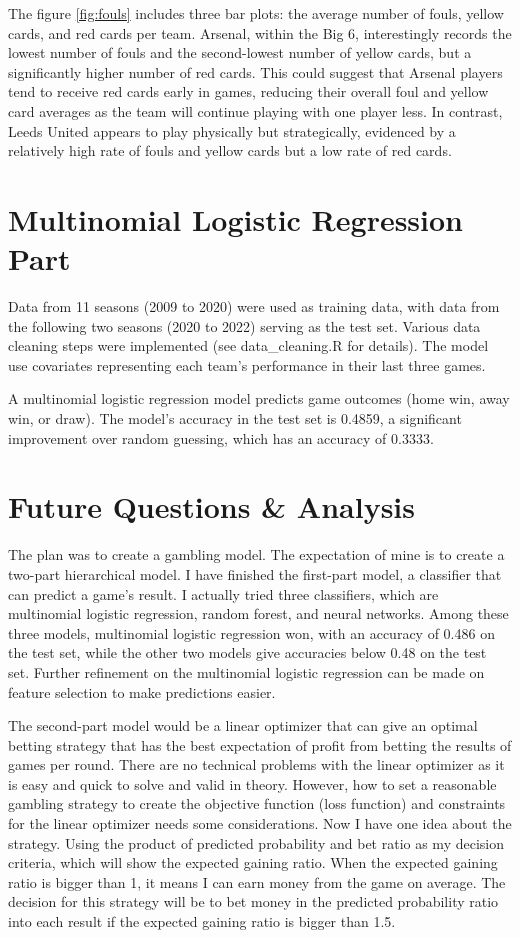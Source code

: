 \documentclass{article}
\begin{document}
The figure \ref{fig:fouls} includes three bar plots: the average number of fouls, yellow cards, and red cards per team. Arsenal, within the Big 6, interestingly records the lowest number of fouls and the second-lowest number of yellow cards, but a significantly higher number of red cards. This could suggest that Arsenal players tend to receive red cards early in games, reducing their overall foul and yellow card averages as the team will continue playing with one player less. In contrast, Leeds United appears to play physically but strategically, evidenced by a relatively high rate of fouls and yellow cards but a low rate of red cards.

\section{Multinomial Logistic Regression Part}
Data from 11 seasons (2009 to 2020) were used as training data, with data from the following two seasons (2020 to 2022) serving as the test set. Various data cleaning steps were implemented (see data\_cleaning.R for details). The model use covariates representing each team's performance in their last three games.

A multinomial logistic regression model predicts game outcomes (home win, away win, or draw). The model's accuracy in the test set is 0.4859, a significant improvement over random guessing, which has an accuracy of 0.3333.

\section{Future Questions \& Analysis}
The plan was to create a gambling model. The expectation of mine is to create a two-part hierarchical model. I have finished the first-part model, a classifier that can predict a game’s result. I actually tried three classifiers, which are multinomial logistic regression, random forest, and neural networks. Among these three models, multinomial logistic regression won, with an accuracy of 0.486 on the test set, while the other two models give accuracies below 0.48 on the test set. Further refinement on the multinomial logistic regression can be made on feature selection to make predictions easier.

The second-part model would be a linear optimizer that can give an optimal betting strategy that has the best expectation of profit from betting the results of games per round. There are no technical problems with the linear optimizer as it is easy and quick to solve and valid in theory. However, how to set a reasonable gambling strategy to create the objective function (loss function) and constraints for the linear optimizer needs some considerations. Now I have one idea about the strategy. Using the product of predicted probability and bet ratio as my decision criteria, which will show the expected gaining ratio. When the expected gaining ratio is bigger than 1, it means I can earn money from the game on average. The decision for this strategy will be to bet money in the predicted probability ratio into each result if the expected gaining ratio is bigger than 1.5.
\end{document}
